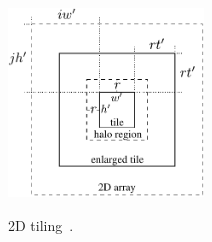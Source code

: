 \begin{figure}[!h]
  \begin{minipage}[b]{0.9\textwidth}
	\centering
	\caption{2D tiling~\cite{Rocha:2017}.}
    \includegraphics[height=5cm]{figs/tile.pdf}
	\label{fig:block2d}
  \end{minipage}
\end{figure}




%




